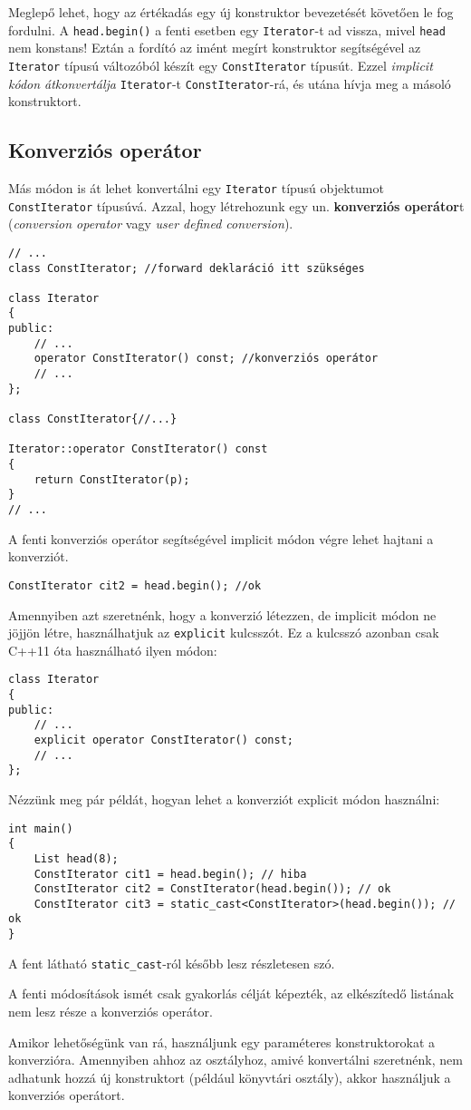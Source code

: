 \documentclass[a4paper,11.5pt,table]{article}
\begin{document}
	Meglepő lehet, hogy az értékadás egy új konstruktor bevezetését követően le fog fordulni. A \texttt{head.begin()} a fenti esetben egy \texttt{Iterator}-t ad vissza, mivel \texttt{head} nem konstans! Eztán a fordító az imént megírt konstruktor segítségével az \texttt{Iterator} típusú változóból készít egy \texttt{ConstIterator} típusút. Ezzel \textit{implicit kódon átkonvertálja} \texttt{Iterator}-t \texttt{ConstIterator}-rá, és utána hívja meg a másoló konstruktort. 
	
	\subsection{Konverziós operátor}
	Más módon is át lehet konvertálni egy \texttt{Iterator} típusú objektumot \texttt{ConstIterator} típusúvá. Azzal, hogy létrehozunk egy un. \textbf{konverziós operátor}t (\textit{conversion operator} vagy \textit{user defined conversion}). 
	\begin{lstlisting}
// ...
class ConstIterator; //forward deklaráció itt szükséges

class Iterator
{
public:
	// ...
	operator ConstIterator() const; //konverziós operátor
	// ...
};

class ConstIterator{//...}

Iterator::operator ConstIterator() const
{
	return ConstIterator(p);
}
// ...
	\end{lstlisting}
	A fenti konverziós operátor segítségével implicit módon végre lehet hajtani a konverziót. 
	\begin{lstlisting}
ConstIterator cit2 = head.begin(); //ok
	\end{lstlisting}	
	Amennyiben azt szeretnénk, hogy a konverzió létezzen, de implicit módon ne jöjjön létre, használhatjuk az \texttt{explicit} kulcsszót. Ez a kulcsszó azonban csak C++11 óta használható ilyen módon:
	\begin{lstlisting}
class Iterator
{
public:
	// ...
	explicit operator ConstIterator() const;
	// ...
};
	\end{lstlisting}
	Nézzünk meg pár példát, hogyan lehet a konverziót explicit módon használni:
	\begin{lstlisting}
int main()
{
	List head(8);
	ConstIterator cit1 = head.begin(); // hiba
	ConstIterator cit2 = ConstIterator(head.begin()); // ok
	ConstIterator cit3 = static_cast<ConstIterator>(head.begin()); // ok
}
	\end{lstlisting}
	\begin{note}
		A fent látható \texttt{static\_cast}-ról később lesz részletesen szó.
	\end{note}
	\begin{note}
		A fenti módosítások ismét csak gyakorlás célját képezték, az elkészítedő listának nem lesz része a konverziós operátor.
	\end{note}
	\begin{note}
    Amikor lehetőségünk van rá, használjunk egy paraméteres konstruktorokat a konverzióra. Amennyiben ahhoz az osztályhoz, amivé konvertálni szeretnénk, nem adhatunk hozzá új konstruktort (például könyvtári osztály), akkor használjuk a konverziós operátort. 
	\end{note}
\end{document}
